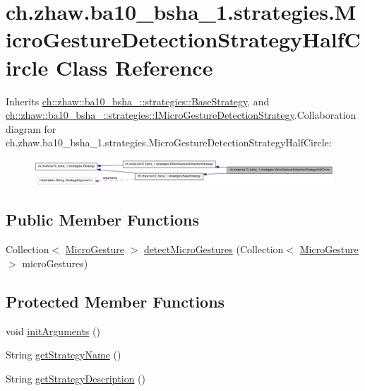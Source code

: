 \hypertarget{classch_1_1zhaw_1_1ba10__bsha__1_1_1strategies_1_1MicroGestureDetectionStrategyHalfCircle}{
\section{ch.zhaw.ba10\_\-bsha\_\-1.strategies.MicroGestureDetectionStrategyHalfCircle Class Reference}
\label{classch_1_1zhaw_1_1ba10__bsha__1_1_1strategies_1_1MicroGestureDetectionStrategyHalfCircle}
}


Inherits \hyperlink{classch_1_1zhaw_1_1ba10__bsha__1_1_1strategies_1_1BaseStrategy}{ch::zhaw::ba10\_\-bsha\_::strategies::BaseStrategy}, and \hyperlink{interfacech_1_1zhaw_1_1ba10__bsha__1_1_1strategies_1_1IMicroGestureDetectionStrategy}{ch::zhaw::ba10\_\-bsha\_::strategies::IMicroGestureDetectionStrategy}.Collaboration diagram for ch.zhaw.ba10\_\-bsha\_\-1.strategies.MicroGestureDetectionStrategyHalfCircle:\nopagebreak
\begin{figure}[H]
\begin{center}
\leavevmode
\includegraphics[width=400pt]{classch_1_1zhaw_1_1ba10__bsha__1_1_1strategies_1_1MicroGestureDetectionStrategyHalfCircle__coll__graph}
\end{center}
\end{figure}
\subsection*{Public Member Functions}
\begin{DoxyCompactItemize}
\item 
Collection$<$ \hyperlink{classch_1_1zhaw_1_1ba10__bsha__1_1_1service_1_1MicroGesture}{MicroGesture} $>$ \hyperlink{classch_1_1zhaw_1_1ba10__bsha__1_1_1strategies_1_1MicroGestureDetectionStrategyHalfCircle_a780f7ded471f8e1dbd141518c41c060e}{detectMicroGestures} (Collection$<$ \hyperlink{classch_1_1zhaw_1_1ba10__bsha__1_1_1service_1_1MicroGesture}{MicroGesture} $>$ microGestures)
\end{DoxyCompactItemize}
\subsection*{Protected Member Functions}
\begin{DoxyCompactItemize}
\item 
void \hyperlink{classch_1_1zhaw_1_1ba10__bsha__1_1_1strategies_1_1MicroGestureDetectionStrategyHalfCircle_a15793e039b14536d9ddb8dd23e839eac}{initArguments} ()
\item 
String \hyperlink{classch_1_1zhaw_1_1ba10__bsha__1_1_1strategies_1_1MicroGestureDetectionStrategyHalfCircle_ab8f20632c110877b3173a3ca6c673bc1}{getStrategyName} ()
\item 
String \hyperlink{classch_1_1zhaw_1_1ba10__bsha__1_1_1strategies_1_1MicroGestureDetectionStrategyHalfCircle_afc528d2770f7e921c54321cdf8e82df3}{getStrategyDescription} ()
\end{DoxyCompactItemize}
